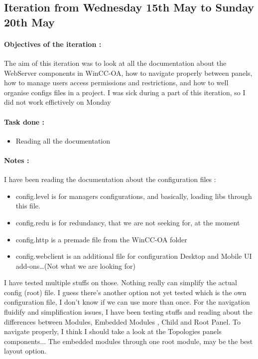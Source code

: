 \documentclass[a4paper, 12pt]{article}
\begin{document}
\begin{appendix}
\subsection{Iteration from Wednesday 15th May to Sunday 20th May}
\paragraph{Objectives of the iteration :}
The aim of this iteration was to look at all the documentation about the WebServer components in WinCC-OA, how to navigate properly between panels, how to manage users access permissions and restrictions, and how to well organise configs files in a project. I was sick during a part of this iteration, so I did not work effictively on Monday
\paragraph{Task done :}
\begin{itemize}
    \item Reading all the documentation
\end{itemize}

\paragraph{Notes :} 
I have been reading the documentation about the configuration files :
\begin{itemize}
    \item config.level is for managers configurations, and basically, loading libs through this file.
    \item config.redu is for redundancy, that we are not seeking for, at the moment
    \item config.http is a premade file from the WinCC-OA folder
    \item config.webclient is an additional file for configuration Desktop and Mobile UI add-ons\dots (Not what we are looking for)
\end{itemize}
I have tested multiple stuffs on those. Nothing really can simplify the actual config (root) file.
I guess there's another option not yet tested which is the own configuration file, I don't know if we can use more than once.\newline
For the navigation fluidify and simplification issues, I have been testing stuffs and reading about the differences between Modules, Embedded Modules , Child and Root Panel.\newline
To navigate properly, I think I should take a look at the Topologies panels components... The embedded modules through one root module, may be the best layout option.


\end{appendix}
\end{document}
